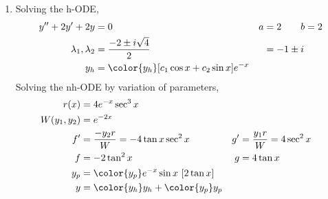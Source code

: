 \begin{enumerate}
    \item Solving the h-ODE,
          \begin{align}
              y''  + 2y' + 2y          & = 0                          &
              a                        & = 2 \qquad b = 2               \\
              \lambda_{1}, \lambda_{2} & = \frac{-2 \pm i\sqrt{4}}{2} &
                                       & = -1 \pm i                     \\
              y_{h}                    & = {\color{y_h} [c_{1}\cos x
                  + c_{2}\sin x]e^{-x}}
          \end{align}
          Solving the nh-ODE by variation of parameters,
          \begin{align}
              r(x)            & = 4e^{-x}\sec ^{3}x                           \\
              W(y_{1}, y_{2}) & = e^{-2x}                                     \\
              f'              & = \frac{-y_{2}r}{W} = -4\tan x \sec^{2}x    &
              g'              & = \frac{y_{1}r}{W} = 4 \sec^{2}x              \\
              f               & = -2\tan^{2}x                               &
              g               & = 4\tan x                                     \\
              y_{p}           & = {\color{y_p} e^{-x}\sin x\ [2\tan x]}       \\
              y               & = {\color{y_h} y_{h}} + {\color{y_p} y_{p}}
          \end{align}


\end{enumerate}
